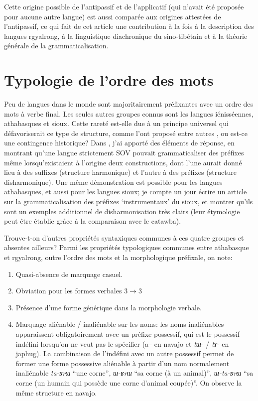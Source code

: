\documentclass[oldfontcommands,oneside,a4paper,11pt]{memoir}
\begin{document}
Cette origine possible de l'antipassif et de l'applicatif (qui n'avait   été proposée pour aucune autre langue) est aussi comparée aux origines attestées de l'antipassif, ce qui fait de cet article une contribution à la fois à la description des langues rgyalrong, à la linguistique diachronique du sino-tibétain et à la théorie générale de la grammaticalisation.


\section{Typologie de l'ordre des mots} \label{sec:ordre}

Peu de langues dans le monde sont majoritairement préfixantes avec un ordre des mots à verbe final. Les seules autres groupes connus sont les langues iénisséennes, athabasques et sioux.  Cette rareté est-elle due à un principe universel qui défavoriserait ce type de structure, comme l'ont proposé entre autres \citet{hawkins88prefixing}, ou est-ce une contingence historique? Dans \citet{jacques13harmonization}, j'ai apporté des éléments de réponse, en montrant qu'une langue strictement SOV pouvait grammaticaliser des préfixes même lorsqu'existaient à l'origine deux constructions, dont l'une aurait donné lieu à des suffixes (structure harmonique) et l'autre à des préfixes (structure disharmonique). Une même démonstration est possible pour les langues athabasques, et aussi pour les langues sioux; je compte un jour écrire un article sur la grammaticalisation des préfixes `instrumentaux' du sioux, et montrer qu'ils sont un exemples additionnel de disharmonisation très clairs (leur étymologie peut être établie grâce à la comparaison avec le catawba).




Trouve-t-on d'autres propriétés syntaxiques communes à ces quatre groupes  et absentes ailleurs?  Parmi les propriétés typologiques communes entre athabasque et rgyalrong, outre l'ordre des mots et la morphologique préfixale, on note:

 \begin{enumerate}
\item Quasi-absence de marquage casuel.

\item Obviation pour les formes verbales 3$\rightarrow$3

\item Présence d'une forme générique dans la morphologie verbale.

\item Marquage aliénable / inaliénable sur les noms: les noms inaliénables apparaissent obligatoirement avec un préfixe possessif, qui est le possessif indéfini lorsqu'on ne veut pas le spécifier (a-- en navajo et \textit{tɯ}- / \textit{tɤ}- en japhug). La combinaison de l'indéfini avec un autre possessif permet de former une forme possessive aliénable à partir d'un nom normalement inaliénable \textit{ta-ʁrɯ} ``une corne'', \textit{ɯ-ʁrɯ} ``sa corne (à un animal)'', \textit{ɯ-ta-ʁrɯ} ``sa corne (un humain qui possède une corne d'animal coupée)''. On observe la même structure en navajo.
\end{enumerate}
\end{document}
